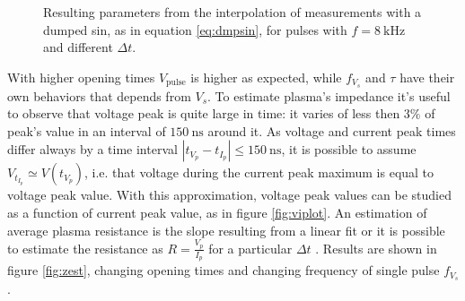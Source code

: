 \begin{figure}
 \centering
 
 \hfill
 \caption{Resulting parameters from the interpolation of measurements with a dumped sin, as in equation \ref{eq:dmpsin}, for pulses with $f=\SI{8}{\kilo\hertz}$ and different $\Delta t$.}
 \label{fig:parexp}
\end{figure}

With higher opening times $ V_{\text{pulse}}$ is higher as expected, while $f_{V_{s}}$ and $\tau$ have their own behaviors that depends from $V_s$.
To estimate plasma's impedance it's useful to observe that voltage peak is quite large in time: it varies of less then $3\%$ of peak's value in an interval of $\SI{150}{\nano\second}$ around it. As voltage and current peak times differ always by a time interval $|t_{V_p} - t_{I_p}| \leq \SI{150}{\nano\second}$, it is possible to assume $V_{t_{I_p}} \simeq V(t_{V_p})$, i.e. that voltage during the current peak maximum is equal to voltage peak value. With this approximation, voltage peak values can be studied as a function of current peak value, as in figure \ref{fig:viplot}. An estimation of average plasma resistance is the slope resulting from a linear fit or it is possible to estimate the resistance as $R = \frac{V_{p}}{I_{p}}$ for a particular $\Delta t$ . Results are shown in figure \ref{fig:zest}, changing opening times and changing frequency of single pulse $f_{V_{s}}$.

